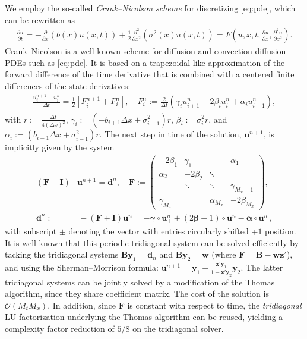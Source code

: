 \documentclass[oneside,11pt]{article}
\newcommand{\lp}{\left(}
\newcommand{\rp}{\right)}
\newcommand{\by}{\mathbf{y}}
\newcommand{\bF}{\mathbf{F}}
\newcommand{\bu}{\mathbf{u}}
\newcommand{\bz}{\mathbf{z}}
\newcommand{\ba}{\boldsymbol\alpha}
\newcommand{\bB}{\mathbf{B}}
\newcommand{\bI}{\mathbf{I}}
\newcommand{\lrp}[1]{\left(#1\right)}
\newcommand{\lrc}[1]{\left[#1\right]}
\newcommand{\pf}[2]{\frac{\partial #1}{\partial #2}}
\newcommand{\pftwo}[2]{\frac{\partial^2 #1}{\partial #2^2}}
\newcommand{\Order}[1]{\mathcal{O}\lp#1\rp}
\begin{document}
We employ the so-called \textit{Crank--Nicolson scheme} for discretizing \eqref{eq:pde}, which can be rewritten as
\begin{align*}
\pf{u}{t}=-\pf{}{x}(b(x)u(x,t))+\frac{1}{2}\pftwo{}{x}(\sigma^2(x)u(x,t))=F\lrp{u,x,t,\pf{u}{x},\pftwo{u}{x}}.
\end{align*}
Crank--Nicolson is a well-known scheme for diffusion and convection-diffusion PDEs such as \eqref{eq:pde}. It is based on a trapezoidal-like approximation of the forward difference of the time derivative that is combined with a centered finite differences of the state derivatives:
\begin{align*}
\frac{u_i^{n+1}-u_i^{n}}{\Delta t}=\frac{1}{2}\lrc{F_i^{n+1}+F_i^{n}},\quad F_i^{n}:=\frac{2}{\Delta t}\lrp{\gamma_i u_{i+1}^{n}-2\beta_i u_{i}^{n}+\alpha_i u_{i-1}^{n}},
\end{align*}
with $r:=\frac{\Delta t}{4(\Delta x)^2}$, $\gamma_i:=\lrp{-b_{i+1}\Delta x + \sigma^2_{i+1}}r$, $\beta_i:=\sigma_i^2r$, and $\alpha_i:=\lrp{b_{i-1}\Delta x + \sigma^2_{i-1}}r$. The next step in time of the solution, $\bu^{n+1}$, is implicitly given by the system
\begin{align}
(\mathbf{F}-\bI)&\bu^{n+1}=\mathbf{d}^n,\quad \mathbf{F}:=\begin{pmatrix}
-2\beta_1 & \gamma_1                     &         & \alpha_1\\
\alpha_2      & -2\beta_2       &    \ddots    & \\
                            & \ddots        & \ddots & \gamma_{{M_x}-1}\\
\gamma_{M_x} &   & \alpha_{M_x} & -2\beta_{M_x}
\end{pmatrix},\nonumber\\
\mathbf{d}^n:=&\,-(\mathbf{F}+\bI)\bu^n =-\boldsymbol\gamma\circ\bu_+^{n}+(2\boldsymbol\beta-1)\circ\bu^{n}-\ba\circ\bu_-^{n},\label{eq:trigdiag}
\end{align}
with subscript $\pm$ denoting the vector with entries circularly shifted $\mp1$ position. It is well-known \citep[page 225]{Thomas1995} that this periodic tridiagonal system can be solved efficiently by tacking the tridiagonal systems $\bB\by_1=\mathbf{d}_n$ and $\bB\by_2=\mathbf{w}$ (where $\bF=\bB - \mathbf{w}\bz'$), and using the Sherman--Morrison formula: $\bu^{n+1}=\by_1+\tfrac{\bz'\by_1}{1-\bz'\by_2}\by_2$. The latter tridiagonal systems can be jointly solved by a modification of the Thomas algorithm, since they share coefficient matrix. The cost of the solution is $\Order{{M_t}{M_x}}$.
In addition, since $\mathbf{F}$ is constant with respect to time, the \textit{tridiagonal} LU factorization underlying the Thomas algorithm can be reused, yielding a complexity factor reduction of $5/8$ on the tridiagonal solver.
\end{document}
